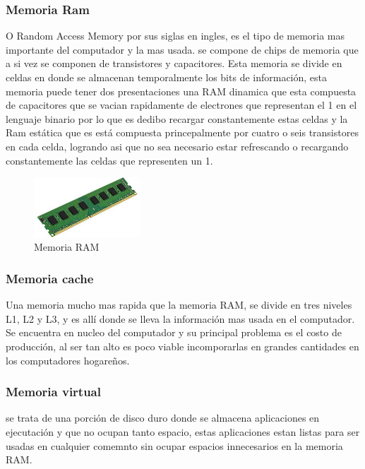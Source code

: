 \documentclass{article}
\begin{document}
        \subsubsection{Memoria Ram}
        O Random Access Memory por sus siglas en ingles, es el tipo de memoria mas importante del computador y la mas usada. se compone de chips de memoria que a si vez se componen de transistores y capacitores. Esta memoria se divide en celdas en donde se almacenan temporalmente los bits de información, esta memoria puede tener dos presentaciones una RAM dinamica que esta compuesta de capacitores que se vacian rapidamente de electrones que representan el 1 en el lenguaje binario por lo que es dedibo recargar constantemente estas celdas y la Ram estática que es está compuesta princepalmente por cuatro o seis transistores en cada celda, logrando asi que no sea necesario estar refrescando o recargando constantemente las celdas que representen un 1.
        
        \begin{figure}[h]
        \includegraphics[width=4cm]{ram.jpg}
        \centering
        \caption{Memoria RAM}
        \label{fig:Memoria RAM}
        \end{figure}    
        
        
        \subsubsection{Memoria cache}
        Una memoria mucho mas rapida que la memoria RAM, se divide en tres niveles L1, L2 y L3, y es allí donde se lleva la información mas usada en el computador. Se encuentra en nucleo del computador y su principal problema es el costo de producción, al ser tan alto es poco viable incomporarlas en grandes cantidades en los computadores hogareños.   
        
        \subsubsection{Memoria virtual}
        se trata de una porción de disco duro donde se almacena aplicaciones en ejecutación y que no ocupan tanto espacio, estas aplicaciones estan listas para ser usadas en cualquier comemnto sin ocupar espacios innecesarios en la memoria RAM.  
        
\end{document}
